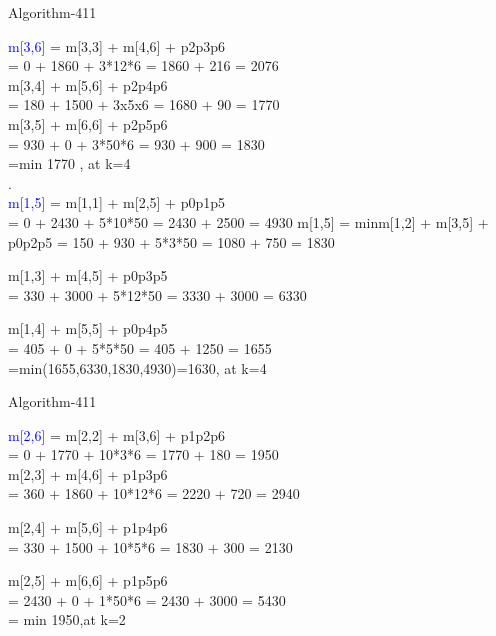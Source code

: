 \documentclass{beamer}
\begin{document}
\begin{frame}[t]{Algorithm-411}
\vspace{15 pt}

\textcolor{blue}{m[3,6]} =  m[3,3] + m[4,6] + p2p3p6\\ = 0 + 1860 + 3*12*6 = 1860 + 216 = 2076 \\

 m[3,4] + m[5,6] + p2p4p6\\ = 180 + 1500 + 3x5x6 = 1680 + 90 = 1770 \\

 m[3,5] + m[6,6] + p2p5p6\\ = 930 + 0 + 3*50*6 = 930 + 900 = 1830 \\
 =min 1770 , at k=4\\.\\
 
\textcolor{blue}{m[1,5]} = m[1,1] + m[2,5] + p0p1p5\\  = 0 + 2430 + 5*10*50 = 2430 + 2500 = 4930
m[1,5] = {min{m[1,2] + m[3,5] + p0p2p5}} = 150 + 930 + 5*3*50 = 1080 + 750 = 1830

 m[1,3] + m[4,5] + p0p3p5\\ = 330 + 3000 + 5*12*50 = 3330 + 3000 = 6330

 m[1,4] + m[5,5] + p0p4p5\\ = 405 + 0 + 5*5*50 = 405 + 1250 = 1655 \\
 =min(1655,6330,1830,4930)=1630, at k=4

\end{frame}


\begin{frame}[t]{Algorithm-411}
\vspace{15 pt}

\textcolor{blue} {m[2,6]} =  m[2,2] + m[3,6] + p1p2p6\\ = 0 + 1770 + 10*3*6 = 1770 + 180 = 1950 \\

 m[2,3] + m[4,6] + p1p3p6\\ = 360 + 1860 + 10*12*6 = 2220 + 720 = 2940

 m[2,4] + m[5,6] + p1p4p6\\ = 330 + 1500 + 10*5*6 = 1830 + 300 = 2130

 m[2,5] + m[6,6] + p1p5p6  \\= 2430 + 0 + 1*50*6 = 2430 + 3000 = 5430\\
= min 1950,at k=2

\end{frame}
\end{document}
